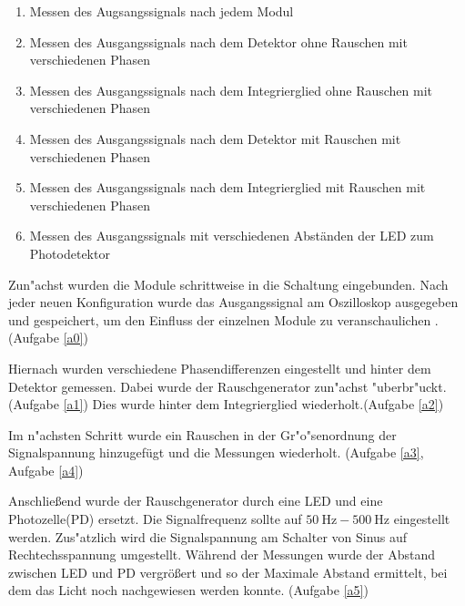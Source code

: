 \documentclass{scrartcl}
\begin{document}
\begin{enumerate}
\item \label{a0} Messen des Augsangssignals nach jedem Modul
\item \label{a1} Messen des Ausgangssignals nach dem Detektor ohne Rauschen mit verschiedenen Phasen
\item \label{a2} Messen des Ausgangssignals nach dem Integrierglied ohne Rauschen mit verschiedenen Phasen
\item \label{a3} Messen des Ausgangssignals nach dem Detektor mit Rauschen mit verschiedenen Phasen
\item \label{a4} Messen des Ausgangssignals nach dem Integrierglied mit Rauschen mit verschiedenen Phasen
\item \label{a5} Messen des Ausgangssignals mit verschiedenen Abständen der LED zum Photodetektor
\end{enumerate}

	Zun"achst wurden die Module schrittweise in die Schaltung eingebunden.
	Nach jeder neuen Konfiguration wurde das Ausgangssignal am Oszilloskop ausgegeben und gespeichert,
	um den Einfluss der einzelnen Module zu veranschaulichen . (Aufgabe \ref{a0})

	Hiernach wurden verschiedene Phasendifferenzen eingestellt und hinter dem Detektor gemessen.
	Dabei wurde der Rauschgenerator zun"achst "uberbr"uckt.(Aufgabe \ref{a1})
	Dies wurde hinter dem Integrierglied wiederholt.(Aufgabe \ref{a2})

	Im n"achsten Schritt wurde ein Rauschen in der Gr"o"senordnung der Signalspannung hinzugefügt und die Messungen
	wiederholt. (Aufgabe \ref{a3}, Aufgabe \ref{a4})

	Anschließend wurde der Rauschgenerator durch eine LED und eine Photozelle(PD) ersetzt.
	Die Signalfrequenz sollte auf $\SI{50}{\hertz}-\SI{500}{\hertz}$ eingestellt werden.
	Zus"atzlich wird die Signalspannung am Schalter von Sinus auf Rechtechsspannung umgestellt.
	Während der Messungen wurde der Abstand zwischen LED und PD vergrößert und so der Maximale Abstand ermittelt,
	bei dem das Licht noch nachgewiesen werden konnte. (Aufgabe \ref{a5})
\end{document}
